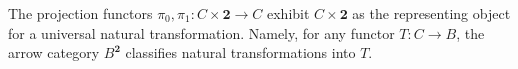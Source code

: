 The projection functors $\pi_0, \pi_1: C \times \mathbf{2} \to C$ exhibit $C \times \mathbf{2}$ as the representing object for a universal natural transformation. Namely, for any functor $T: C \to B$, the arrow category $B^{\mathbf{2}}$ classifies natural transformations into $T$.
